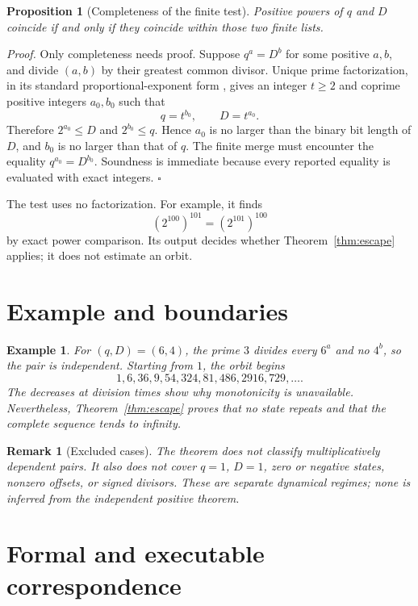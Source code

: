 \documentclass[11pt,letterpaper]{article}
\newtheorem{proposition}[theorem]{Proposition}
\newtheorem{example}[theorem]{Example}
\newtheorem{remark}[theorem]{Remark}
\newenvironment{proof}{\noindent\textit{Proof.}}{\hfill\(\square\)}
\begin{document}
\begin{proposition}[Completeness of the finite test]\label{prop:test}
Positive powers of $q$ and $D$ coincide if and only if they coincide within
those two finite lists.
\end{proposition}

\begin{proof}
Only completeness needs proof.  Suppose $q^a=D^b$ for some positive
$a,b$, and divide $(a,b)$ by their greatest common divisor.  Unique prime
factorization, in its standard proportional-exponent form
\cite[Ch.~I]{HardyWright08}, gives an integer $t\geq2$ and coprime positive
integers $a_0,b_0$ such that
\[
 q=t^{b_0},\qquad D=t^{a_0}.
\]
Therefore $2^{a_0}\leq D$ and $2^{b_0}\leq q$.  Hence $a_0$ is no larger
than the binary bit length of $D$, and $b_0$ is no larger than that of $q$.
The finite merge must encounter the equality
$q^{a_0}=D^{b_0}$.  Soundness is immediate because every reported equality
is evaluated with exact integers.
\end{proof}

The test uses no factorization.  For example, it finds
\[
 (2^{100})^{101}=(2^{101})^{100}
\]
by exact power comparison.  Its output decides whether
Theorem~\ref{thm:escape} applies; it does not estimate an orbit.

\section{Example and boundaries}

\begin{example}
For $(q,D)=(6,4)$, the prime $3$ divides every $6^a$ and no $4^b$, so the
pair is independent.  Starting from $1$, the orbit begins
\[
 1,6,36,9,54,324,81,486,2916,729,\ldots.
\]
The decreases at division times show why monotonicity is unavailable.
Nevertheless, Theorem~\ref{thm:escape} proves that no state repeats and that
the complete sequence tends to infinity.
\end{example}

\begin{remark}[Excluded cases]
The theorem does not classify multiplicatively dependent pairs.  It also
does not cover $q=1$, $D=1$, zero or negative states, nonzero offsets, or
signed divisors.  These are separate dynamical regimes; none is inferred
from the independent positive theorem.
\end{remark}

\section{Formal and executable correspondence}
\end{document}
